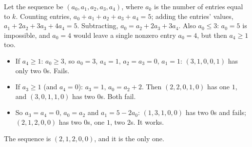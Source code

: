 Let the sequence be $(a_0,a_1,a_2,a_3,a_4)$, where $a_k$ is the number of entries equal to $k$. Counting entries, $a_0+a_1+a_2+a_3+a_4=5$; adding the entries' values, $a_1+2a_2+3a_3+4a_4=5$. Subtracting, $a_0=a_2+2a_3+3a_4$. Also $a_0\le3$: $a_0=5$ is impossible, and $a_0=4$ would leave a single nonzero entry $a_0=4$, but then $a_4\ge1$ too.
\begin{itemize}
\item If $a_4\ge1$: $a_0\ge3$, so $a_0=3$, $a_4=1$, $a_2=a_3=0$, $a_1=1$: $(3,1,0,0,1)$ has only two $0$s. Fails.
\item If $a_3\ge1$ (and $a_4=0$): $a_3=1$, $a_0=a_2+2$. Then $(2,2,0,1,0)$ has one $1$, and $(3,0,1,1,0)$ has two $0$s. Both fail.
\item So $a_3=a_4=0$, $a_0=a_2$ and $a_1=5-2a_0$: $(1,3,1,0,0)$ has two $0$s and fails; $(2,1,2,0,0)$ has two $0$s, one $1$, two $2$s. It works.
\end{itemize}
The sequence is $\boxed{(2,1,2,0,0)}$, and it is the only one.
